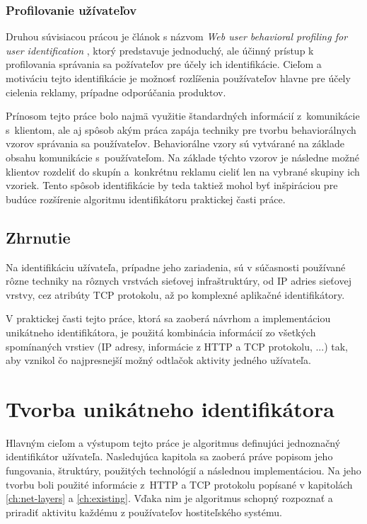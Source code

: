 \documentclass[
  printed, %
  table,   %
  lof,     %
  nolot,   %
  nocover
]{fithesis3}
\begin{document}
\subsection{Profilovanie užívateľov}
Druhou súvisiacou prácou je článok s názvom \textit{Web user behavioral profiling for user identification} \cite{Yang:2010:Prof},
ktorý predstavuje
jednoduchý, ale účinný prístup k profilovania správania sa požívateľov pre účely ich identifikácie.
Cieľom a motiváciu tejto identifikácie je možnosť rozlíšenia používateľov hlavne pre účely cielenia
reklamy, prípadne odporúčania produktov.

Prínosom tejto práce bolo najmä využitie štandardných informácií z~komunikácie s~klientom, ale aj spôsob akým práca zapája 
techniky pre tvorbu behaviorálnych vzorov správania sa používateľov. Behaviorálne vzory sú vytvárané na základe obsahu komunikácie
s~používateľom. Na základe týchto vzorov je následne možné klientov
rozdeliť do skupín a~konkrétnu reklamu cieliť len na vybrané skupiny ich vzoriek. Tento spôsob identifikácie by teda taktiež mohol byť inšpiráciou
pre budúce rozšírenie algoritmu identifikátoru praktickej časti práce.

\section{Zhrnutie}
Na identifikáciu užívateľa, prípadne jeho zariadenia, sú v súčasnosti
používané rôzne techniky na rôznych vrstvách sieťovej infraštruktúry, od IP
adries sieťovej vrstvy, cez atribúty TCP protokolu, až po komplexné aplikačné
identifikátory. 

V praktickej časti tejto práce, ktorá sa zaoberá návrhom a implementáciou
unikátneho identifikátora, je použitá kombinácia informácií zo všetkých
spomínaných vrstiev (IP adresy, informácie z HTTP a TCP protokolu, ...) tak,
aby vznikol čo najpresnejší možný odtlačok aktivity jedného užívateľa.

\chapter{Tvorba unikátneho identifikátora}
\label{ch:footprint}
Hlavným cieľom a výstupom tejto práce je algoritmus definujúci jednoznačný
identifikátor užívateľa. Nasledujúca kapitola sa zaoberá práve popisom jeho
fungovania, štruktúry, použitých technológií a následnou implementáciou. Na
jeho tvorbu boli použité informácie z~HTTP a TCP protokolu popísané v
kapitolách \ref{ch:net-layers} a \ref{ch:existing}. Vďaka nim je algoritmus
schopný rozpoznať a priradiť aktivitu každému z používateľov hostiteľského
systému.
\end{document}
